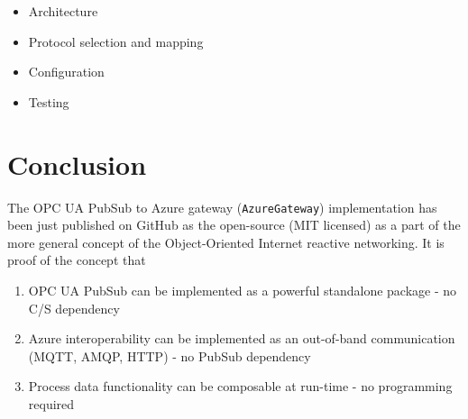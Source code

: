 \documentclass[
]{article}
\providecommand{\tightlist}{%
  \setlength{\itemsep}{0pt}\setlength{\parskip}{0pt}}
\begin{document}
\begin{itemize}
\tightlist
\item
  Architecture
\item
  Protocol selection and mapping
\item
  Configuration
\item
  Testing
\end{itemize}

\hypertarget{conclusion}{%
\section{Conclusion}\label{conclusion}}

The OPC UA PubSub to Azure gateway (\texttt{AzureGateway})
implementation has been just published on GitHub as the open-source (MIT
licensed) as a part of the more general concept of the Object-Oriented
Internet reactive networking. It is proof of the concept that

\begin{enumerate}
\def\labelenumi{\arabic{enumi}.}
\tightlist
\item
  OPC UA PubSub can be implemented as a powerful standalone package - no
  C/S dependency
\item
  Azure interoperability can be implemented as an out-of-band
  communication (MQTT, AMQP, HTTP) - no PubSub dependency
\item
  Process data functionality can be composable at run-time - no
  programming required
\end{enumerate}
\end{document}

